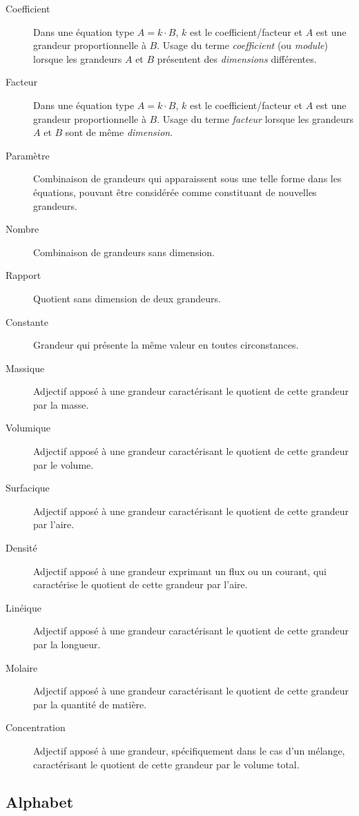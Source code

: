 \begin{description}
\item[Coefficient] Dans une équation type $A=k \cdot B$, $k$ est le coefficient/facteur et $A$ est une grandeur proportionnelle à $B$. Usage du terme \emph{coefficient} (ou \emph{module}) lorsque les grandeurs $A$ et $B$ présentent des \emph{dimensions} différentes.
\item[Facteur] Dans une équation type $A=k \cdot B$, $k$ est le coefficient/facteur et $A$ est une grandeur proportionnelle à $B$. Usage du terme \emph{facteur} lorsque les grandeurs $A$ et $B$ sont de même \emph{dimension}.
\item[Paramètre] Combinaison de grandeurs qui apparaissent sous une telle forme dans les équations, pouvant être considérée comme constituant de nouvelles grandeurs.
\item[Nombre] Combinaison de grandeurs sans dimension.
\item[Rapport] Quotient sans dimension de deux grandeurs.
\item[Constante] Grandeur qui présente la même valeur en toutes circonstances.
\item[Massique] Adjectif apposé à une grandeur caractérisant le quotient de cette grandeur par la masse.
\item[Volumique] Adjectif apposé à une grandeur caractérisant le quotient de cette grandeur par le volume.
\item[Surfacique] Adjectif apposé à une grandeur caractérisant le quotient de cette grandeur par l'aire.
\item[Densité] Adjectif apposé à une grandeur exprimant un flux ou un courant, qui caractérise le quotient de cette grandeur par l'aire.
\item[Linéique] Adjectif apposé à une grandeur caractérisant le quotient de cette grandeur par la longueur.
\item[Molaire] Adjectif apposé à une grandeur caractérisant le quotient de cette grandeur par la quantité de matière.
\item[Concentration] Adjectif apposé à une grandeur, spécifiquement dans le cas d'un mélange, caractérisant le quotient de cette grandeur par le volume total.
\end{description}

\subsection{Alphabet}

